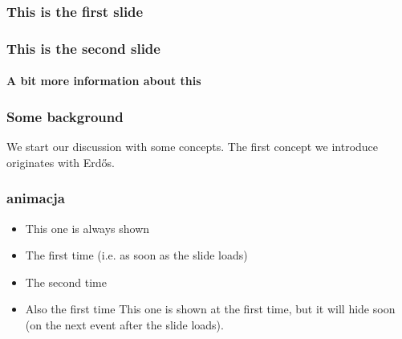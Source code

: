 \documentclass{beamer}
\begin{document}
	\begin{frame}
		\frametitle{This is the first slide}
	\end{frame}
	
	\begin{frame}
		\frametitle{This is the second slide}
		\framesubtitle{A bit more information about this}
	\end{frame}
	
	\begin{frame}
		\frametitle{Some background}
		We start our discussion with some concepts.
		\pause
		The first concept we introduce originates with Erd\H os.
	\end{frame}
	
	\begin{frame}
		\frametitle{animacja}
		\begin{itemize}
			\item This one is always shown
			\item<1-> The first time (i.e. as soon as the slide loads)
			\item<2-> The second time
			\item<1-> Also the first time
			\only<1-1> {This one is shown at the first time, but it will hide soon (on the next event after the slide loads).}
		\end{itemize}
	\end{frame}
\end{document}
